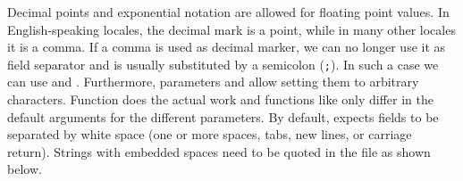 \documentclass[krantz2]{krantz}\usepackage{knitr}
\begin{document}
\begin{knitrout}\footnotesize
{}\color{fgcolor}\begin{kframe}
\begin{alltt}
\end{alltt}


{\ttfamily\noindent\bfseries\color{errorcolor}{\#\# Error in lapply(X = X, FUN = FUN, ...): object 'from\_csv\_c.df' not found}}\begin{alltt}
\hlstd{from_csv_c.df[[}\hlstd{]]}
\end{alltt}


{\ttfamily\noindent\bfseries\color{errorcolor}{\#\# Error in eval(expr, envir, enclos): object 'from\_csv\_c.df' not found}}\end{kframe}
\end{knitrout}

Decimal points and exponential notation are allowed for floating point values. In English-speaking locales, the decimal mark is a point, while in many other locales it is a comma. If a comma is used as decimal marker, we can no longer use it as field separator and is usually substituted by a semicolon (\verb|;|). In such a case we can use  and . Furthermore, parameters  and  allow setting them to arbitrary characters. Function  does the actual work and functions like  only differ in the default arguments for the different parameters. By default,  expects fields to be separated by white space (one or more spaces, tabs, new lines, or carriage return). Strings with embedded spaces need to be quoted in the file as shown below.

\begin{knitrout}\footnotesize
{}\color{fgcolor}\begin{kframe}


{\ttfamily\noindent{}}

{\ttfamily\noindent\bfseries{}}\end{kframe}
\end{knitrout}
\end{document}
